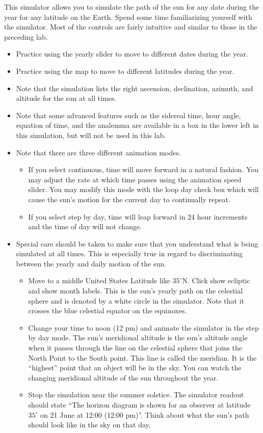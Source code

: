 \documentclass[11pt]{article}
\begin{document}
This simulator allows you to simulate the path of the sun for any date during the year for any latitude on the Earth. Spend some time familiarizing yourself with the simulator. Most of the controls are fairly intuitive and similar to those in the preceding lab. 

\begin{itemize}
\item	Practice using the yearly slider to move to different dates during the year.
\item	Practice using the map to move to different latitudes during the year. 
\item	Note that the simulation lists the right ascension, declination, azimuth, and altitude for the sun at all times. 
\item	Note that some advanced features such as the sidereal time, hour angle, equation of time, and the analemma are available in a box in the lower left in this simulation, but will not be used in this lab. 
\item	Note that there are three different animation modes. 
\begin{itemize}
\item	If you select continuous, time will move forward in a natural fashion. You may adjust the rate at which time passes using the animation speed slider. You may modify this mode with the loop day check box which will cause the sun's motion for the current day to continually repeat.
\item	 If you select step by day, time will leap forward in 24 hour increments and the time of day will not change. 
\end{itemize}
\item	Special care should be taken to make sure that you understand what is being simulated at all times. This is especially true in regard to discriminating between the yearly and daily motion of the sun. 
\begin{itemize}
\item	Move to a middle United States Latitude like $35^\circ$N. Click show ecliptic and show month labels. This is the sun's yearly path on the celestial sphere and is denoted by a white circle in the simulator. Note that it crosses the blue celestial equator on the equinoxes. 
\item	Change your time to noon (12 pm) and animate the simulator in the step by day mode. The sun's meridional altitude is the sun's altitude angle when it passes through the line on the celestial sphere that joins the North Point to the South point. This line is called the meridian. It is the ``highest'' point that an object will be in the sky. You can watch the changing meridional altitude of the sun throughout the year. 
\item	Stop the simulation near the summer solstice. The simulator readout should state ``The horizon diagram is shown for an observer at latitude $35^\circ$ on 21 June at 12:00 (12:00 pm)''. Think about what the sun's path should look like in the sky on that day. 
\end{itemize}
\end{itemize}
\end{document}
